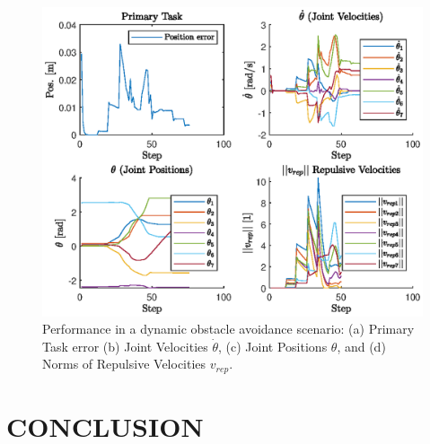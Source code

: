 \documentclass[letterpaper, 10 pt, conference]{ieeeconf}  %
\begin{document}
\begin{figure}
	\centering
	\includegraphics[width=1\linewidth]{4plots_ball.eps} %
	\caption{Performance in a dynamic obstacle avoidance scenario: (a) Primary Task error (b) Joint Velocities $\dot{\theta}$, (c) Joint Positions $\theta$, and (d) Norms of Repulsive Velocities $v_{rep}$.}
	\label{fig:plots-ball}
\end{figure}
%



\section{CONCLUSION}


\addtolength{\textheight}{-12cm}   %
\end{document}
